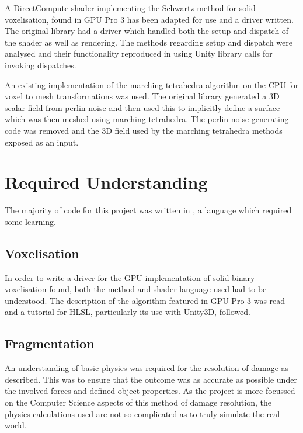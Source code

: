 A {} DirectCompute shader implementing the Schwartz method for solid voxelisation, found in GPU Pro 3 has been adapted for use and a {} driver written\cite{Schwarz:2010:Vox}\cite{Engel:2012:GPA:2331213}. The original library had a {} driver which handled both the setup and dispatch of the shader as well as rendering. The methods regarding setup and dispatch were analysed and their functionality reproduced in {} using Unity library calls for invoking dispatches.

An existing implementation of the marching tetrahedra algorithm on the CPU for voxel to mesh transformations\cite{Tetrahedra-CPU} was used. The original library generated a 3D scalar field from perlin noise and then used this to implicitly define a surface which was then meshed using marching tetrahedra. The perlin noise generating code was removed and the 3D field used by the marching tetrahedra methods exposed as an input.

\section{Required Understanding}

The majority of code for this project was written in {}, a language which required some learning.

\subsection{Voxelisation}

In order to write a driver for the GPU implementation of solid binary voxelisation found, both the method and shader language used had to be understood. The description of the algorithm featured in GPU Pro 3 was read and a tutorial for HLSL, particularly its use with Unity3D, followed\cite{Engel:2012:GPA:2331213}.

\subsection{Fragmentation}

An understanding of basic physics was required for the resolution of damage as described. This was to ensure that the outcome was as accurate as possible under the involved forces and defined object properties. As the project is more focussed on the Computer Science aspects of this method of damage resolution, the physics calculations used are not so complicated as to truly simulate the real world.

